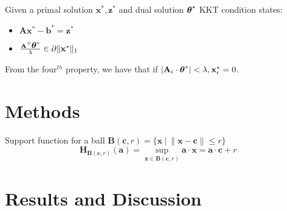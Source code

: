 \documentclass[
10pt, %
a4paper, %
oneside, %
headinclude,footinclude, %
BCOR5mm, %
]{scrartcl}
\newcommand{\AB}{\mathbf{A}}
\newcommand{\BB}{\mathbf{B}}
\newcommand{\HB}{\mathbf{H}}
\newcommand{\aB}{\mathbf{a}}
\newcommand{\bB}{\mathbf{b}}
\newcommand{\cB}{\mathbf{c}}
\newcommand{\xB}{\mathbf{x}}
\newcommand{\zB}{\mathbf{z}}
\newcommand{\thetaB}{\mbox{\boldmath$\theta$\unboldmath}}
\begin{document}
Given a primal solution $\xB^*, \zB^*$ and dual solution $\thetaB^*$ KKT condition states:
\begin{itemize}
	\item $\AB\xB^* - \bB^* = \zB^*$
	\item $\frac{\AB^\top\thetaB^*}{\lambda} \in \partial \|\xB^*\|_1$
\end{itemize}
From the four$^{th}$ property, we have that if $|\AB_i \cdot \thetaB^*| < \lambda, \xB_i^* = 0$.



\section{Methods}

Support function for a ball $\BB(\cB, r) = \{\xB ~|~ \|\xB-\cB\|\leq r\}$
\begin{equation}
	\HB_{\BB(\cB, r)}(\aB) = \sup_{\xB \in \BB(\cB, r)} \aB\cdot\xB = \aB\cdot\cB + r
\end{equation}

\section{Results and Discussion}


\renewcommand{\refname}{\spacedlowsmallcaps{References}} %




\end{document}
